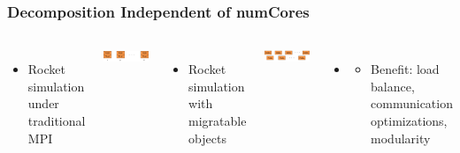 \begin{frame}[t]
\frametitle{Decomposition Independent of numCores}
  \begin{columns}
    \begin{itemize}
      \item Rocket simulation under traditional MPI
    \end{itemize}
    \begin{center} \includegraphics[width=.6\textwidth]{figures/rocket_mpi} \end{center}
    \pause
    \begin{itemize}
      \item Rocket simulation with migratable objects
    \end{itemize}
    \begin{center} \includegraphics[width=.6\textwidth]{figures/rocket_charm} \end{center}
    \begin{itemize}
      \item
      \begin{itemize}
      \item Benefit: load balance, communication optimizations, modularity
      \end{itemize}
    \end{itemize}
    \vfill
    \vfill
  \end{columns}
\end{frame}

